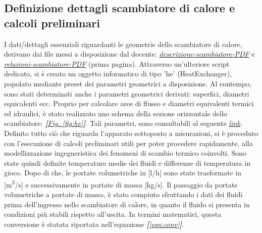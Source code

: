 \documentclass[a4paper,10pt]{article}                                                                                       %
\begin{document}
\subsection{Definizione dettagli scambiatore di calore e calcoli preliminari}                                               %
\label{subsec:hedef_prelcalcs}                                                                                              %
  I dati/dettagli essenziali riguardanti le geometrie dello scambiatore di calore, derivano dai file messi a disposizione
  dal docente:
  \textit{\href{https://github.com/CristianMerli/DataAnalysis/blob/master/lab_doc/DescrizioneScambiatore.pdf}{descrizione-scambiatore-PDF}}
  e \textit{\href{https://github.com/CristianMerli/DataAnalysis/blob/master/lab_doc/RelazioniScambiatore.pdf}{relazioni-scambiatore-PDF}}
  (prima pagina). Attraverso un'ulteriore script dedicato, si è creato un oggetto informatico di tipo 'he' (HeatExchanger),
  popolato mediante preset dei parametri geometrici a disposizione. Al contempo, sono stati determinati anche i parametri
  geometrici derivati: superfici, diametri equicalenti ecc. Proprio per calcolare aree di flusso e diametri equivalenti
  termici ed idraulici, è stato realizzato uno schema della sezione orizzontale dello scambiatore:
  \textit{\textbf{[}\hyperref[fig:he]{Fig. }\ref{fig:he}\textbf{]}}. Tali parametri, sono consultabili al seguente
  \textit{\href{https://github.com/CristianMerli/DataAnalysis/blob/master/final_doc/code_exports/output/he.txt}{link}}.
  Definito tutto ciò che riguarda l'apparato sottoposto a misurazioni, si è proceduto con l'esecuzione di calcoli
  preliminari utili per poter procedere rapidamente, alla modellizzazione ingegneristica dei fenomeni di scambio termico
  coinvolti. Sono state quindi definite temperature medie dei fluidi e differenze di temperatura in gioco. Dopo di che, le
  portate volumetriche in [l/h] sono state trasformate in [m\textsuperscript{3}/s] e successivamente in portate di massa
  [kg/s]. Il passaggio da portate volumetriche a portate di massa, è stato compiuto sfruttando i dati dei fluidi prima
  dell'ingresso nello scambiatore di calore, in quanto il fluido si presenta in condizioni più stabili rispetto
  all'uscita. In termini matematici, questa conversione è statata riportata nell'equazione
  \textit{\textbf{[}\ref{eqn:conv}\textbf{]}}.
\end{document}
